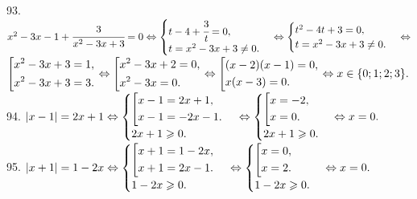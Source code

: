 93. $x^2-3x-1+\cfrac{3}{x^2-3x+3}=0\Leftrightarrow \begin{cases}t-4+\cfrac{3}{t}=0,\\ t=x^2-3x+3\neq0.\end{cases}\Leftrightarrow
\begin{cases}t^2-4t+3=0,\\ t=x^2-3x+3\neq0.\end{cases}\Leftrightarrow$\\$\left[\begin{gathered}
     x^2-3x+3=1,\hfill\\
     x^2-3x+3=3.\hfill \end{gathered}\right.\Leftrightarrow\left[\begin{gathered}
     x^2-3x+2=0,\hfill\\
     x^2-3x=0.\hfill \end{gathered}\right.\Leftrightarrow\left[\begin{gathered}
     (x-2)(x-1)=0,\hfill\\
     x(x-3)=0.\hfill \end{gathered}\right.\Leftrightarrow x\in\{0;1;2;3\}.$\\
94. $|x-1|=2x+1\Leftrightarrow\begin{cases}\left[
      \begin{gathered} x-1=2x+1,\hfill\\
      x-1=-2x-1.\hfill \end{gathered}\right.\\
2x+1\geqslant0.\end{cases}\Leftrightarrow\begin{cases}\left[
      \begin{gathered} x=-2,\hfill\\
      x=0.\hfill \end{gathered}\right.\\
2x+1\geqslant0.\end{cases}\Leftrightarrow x=0.$\\
95. $|x+1|=1-2x\Leftrightarrow\begin{cases}\left[
      \begin{gathered} x+1=1-2x,\hfill\\
      x+1=2x-1.\hfill \end{gathered}\right.\\
1-2x\geqslant0.\end{cases}\Leftrightarrow\begin{cases}\left[
      \begin{gathered} x=0,\hfill\\
      x=2.\hfill \end{gathered}\right.\\
1-2x\geqslant0.\end{cases}\Leftrightarrow x=0.$\\
